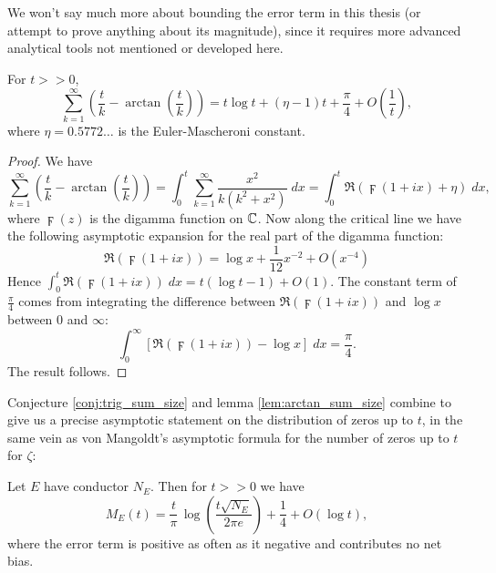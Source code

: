 We won't say much more about bounding the error term in this thesis (or attempt to prove anything about its magnitude), since it requires more advanced analytical tools not mentioned or developed here. \\

\begin{lemma}\label{lem:arctan_sum_size}
For $t >> 0$, 
\begin{equation}
\sum_{k=1}^{\infty} \left(\frac{t}{k} - \arctan\left(\frac{t}{k}\right)\right) = t\log t + (\eta-1)t + \frac{\pi}{4} + O\left(\frac{1}{t}\right),
\end{equation}
where $\eta = 0.5772\ldots$ is the Euler-Mascheroni constant.
\end{lemma}
\begin{proof}
We have
\begin{equation*}
\sum_{k=1}^{\infty} \left(\frac{t}{k} - \arctan\left(\frac{t}{k}\right)\right) = \int_{0}^{t} \sum_{k=1}^{\infty} \frac{x^2}{k(k^2+x^2)} \; dx = \int_{0}^{t} \Re\left(\digamma(1+ix) + \eta\right) \; dx,
\end{equation*}
where $\digamma(z)$ is the digamma function on $\mathbb{C}$. Now along the critical line we have the following asymptotic expansion for the real part of the digamma function:
\begin{equation}
\Re\left(\digamma(1+ix)\right) = \log x + \frac{1}{12} x^{-2} + O(x^{-4})
\end{equation}
Hence $\int_{0}^{t} \Re\left(\digamma(1+ix)\right) \; dx = t(\log t - 1)  + O(1)$. The constant term of $\frac{\pi}{4}$ comes from integrating the difference between $\Re\left(\digamma(1+ix)\right)$ and $\log x$ between $0$ and $\infty$:
\begin{equation*}
\int_{0}^{\infty} \left[\Re\left(\digamma(1+ix)\right) - \log x\right] \; dx = \frac{\pi}{4}.
\end{equation*}
The result follows.
\end{proof}

Conjecture \ref{conj:trig_sum_size} and lemma \ref{lem:arctan_sum_size} combine to give us a precise asymptotic statement on the distribution of zeros up to $t$, in the same vein as von Mangoldt's asymptotic formula for the number of zeros up to $t$ for $\zeta$:

\begin{theorem}[GRH]\label{thm:zero_density}
Let $E$ have conductor $N_E$. Then for $t>>0$ we have
\begin{equation}\label{eqn:zero_density}
M_E(t) = \frac{t}{\pi} \, \log\left(\frac{t\sqrt{N_E}}{2\pi e}\right) + \frac{1}{4} + O(\log t),
\end{equation}
where the error term is positive as often as it negative and contributes no net bias.
\end{theorem}

